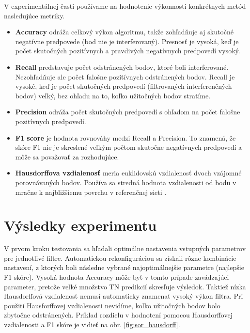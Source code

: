 V experimentálnej časti používame na hodnotenie výkonnosti konkrétnych metód nasledujúce metriky.

\begin{itemize}
\item \textbf{Accuracy} odráža celkový výkon algoritmu, takže zohľadňuje aj skutočné negatívne predpovede (bod nie je interferovaný). Presnosť je vysoká, keď je počet skutočných pozitívnych a pravdivých negatívnych predpovedí vysoký.

\item \textbf{Recall} predstavuje počet odstránených bodov, ktoré boli interferované. Nezohľadňuje ale počet falošne pozitívnych odstránených bodov. Recall je vysoké, keď je počet skutočných predpovedí (filtrovaných interferenčných bodov) veľký, bez ohľadu na to, koľko užitočných bodov stratíme.

\item \textbf{Precision} odráža počet skutočných predpovedí s ohľadom na počet falošne pozitívnych predpovedí.

\item \textbf{F1 score} je hodnota rovnováhy medzi Recall a Precision. To znamená, že skóre F1 nie je skreslené veľkým počtom skutočne negatívnych predpovedí a môže sa považovať za rozhodujúce.

\item \textbf{Hausdorffova vzdialenosť} meria euklidovskú vzdialenosť dvoch vzájomné porovnávaných bodov. Používa sa stredná hodnota vzdialenosti od bodu v mračne k najbližšiemu povrchu v referenčnej sieti .
\end{itemize}

\section{Výsledky experimentu}

V prvom kroku testovania sa hľadali optimálne nastavenia vstupných parametrov pre jednotlivé filtre. Automatickou rekonfiguráciou sa získali rôzne kombinácie nastavení, z ktorých boli následne vybrané najoptimálnejšie parametre (najlepšie F1 skóre). Vysoká hodnota Accuracy môže byť v tomto prípade zavádzajúci parameter, pretože veľké množstvo TN predikcií skresľuje výsledok. Taktiež nízka Hausdorffová vzdialenosť nemusí automaticky znamenať vysoký výkon filtra. Pri použití Hausforffovej vzdialenosti nevidíme, koľko užitočných bodov bolo zbytočne odstránených. Príklad rozdielu v hodnotení pomocou Hausdorffovej vzdialenosti a F1 skóre je vidieť na obr. \ref{fig:sor_hausdorff}. 



